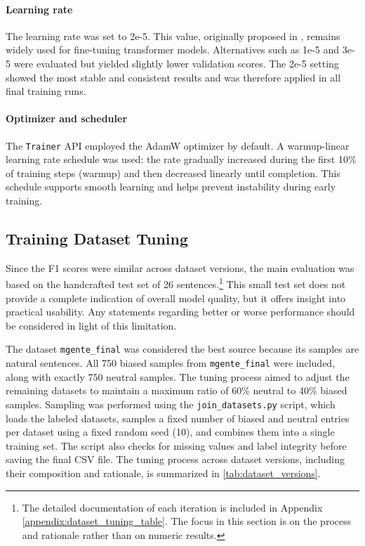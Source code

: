     \paragraph{Learning rate} The learning rate was set to 2e-5. This value, originally proposed in \textcite{devlinBERTPretrainingDeep2019}, remains widely used for fine-tuning transformer models. Alternatives such as 1e-5 and 3e-5 were evaluated but yielded slightly lower validation scores. The 2e-5 setting showed the most stable and consistent results and was therefore applied in all final training runs.

    \paragraph{Optimizer and scheduler} The \texttt{Trainer} API employed the AdamW optimizer by default. A warmup-linear learning rate schedule was used: the rate gradually increased during the first 10\% of training steps (warmup) and then decreased linearly until completion. This schedule supports smooth learning and helps prevent instability during early training.

\subsection{Training Dataset Tuning} \label{subsection:training_dataset_tuning}
    Since the F1 scores were similar across dataset versions, the main evaluation was based on the handcrafted test set of 26 sentences.\footnote{The detailed documentation of each iteration is included in Appendix \ref{appendix:dataset_tuning_table}. The focus in this section is on the process and rationale rather than on numeric results.} This small test set does not provide a complete indication of overall model quality, but it offers insight into practical usability. Any statements regarding better or worse performance should be considered in light of this limitation.

    The dataset \texttt{mgente\_final} was considered the best source because its samples are natural sentences. All 750 biased samples from \texttt{mgente\_final} were included, along with exactly 750 neutral samples. The tuning process aimed to adjust the remaining datasets to maintain a maximum ratio of 60\% neutral to 40\% biased samples. Sampling was performed using the \texttt{join\_datasets.py} script, which loads the labeled datasets, samples a fixed number of biased and neutral entries per dataset using a fixed random seed (10), and combines them into a single training set. The script also checks for missing values and label integrity before saving the final CSV file. The tuning process across dataset versions, including their composition and rationale, is summarized in \autoref{tab:dataset_versions}.


